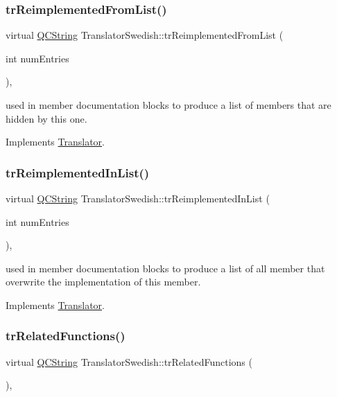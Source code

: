 \subsubsection{\texorpdfstring{trReimplementedFromList()}{trReimplementedFromList()}}
{\footnotesize\ttfamily virtual \mbox{\hyperlink{class_q_c_string}{Q\+C\+String}} Translator\+Swedish\+::tr\+Reimplemented\+From\+List (\begin{DoxyParamCaption}\item[{int}]{num\+Entries }\end{DoxyParamCaption})\hspace{0.3cm}{\ttfamily [inline]}, {\ttfamily [virtual]}}

used in member documentation blocks to produce a list of members that are hidden by this one. 

Implements \mbox{\hyperlink{class_translator}{Translator}}.

\mbox{\label{class_translator_swedish_a2f4d975460348732707b402d82e3cae9}} 
\subsubsection{\texorpdfstring{trReimplementedInList()}{trReimplementedInList()}}
{\footnotesize\ttfamily virtual \mbox{\hyperlink{class_q_c_string}{Q\+C\+String}} Translator\+Swedish\+::tr\+Reimplemented\+In\+List (\begin{DoxyParamCaption}\item[{int}]{num\+Entries }\end{DoxyParamCaption})\hspace{0.3cm}{\ttfamily [inline]}, {\ttfamily [virtual]}}

used in member documentation blocks to produce a list of all member that overwrite the implementation of this member. 

Implements \mbox{\hyperlink{class_translator}{Translator}}.

\mbox{\label{class_translator_swedish_ad6132738b6b5c699ef57165ddd905688}} 
\subsubsection{\texorpdfstring{trRelatedFunctions()}{trRelatedFunctions()}}
{\footnotesize\ttfamily virtual \mbox{\hyperlink{class_q_c_string}{Q\+C\+String}} Translator\+Swedish\+::tr\+Related\+Functions (\begin{DoxyParamCaption}{ }\end{DoxyParamCaption})\hspace{0.3cm}{\ttfamily [inline]}, {\ttfamily [virtual]}}

